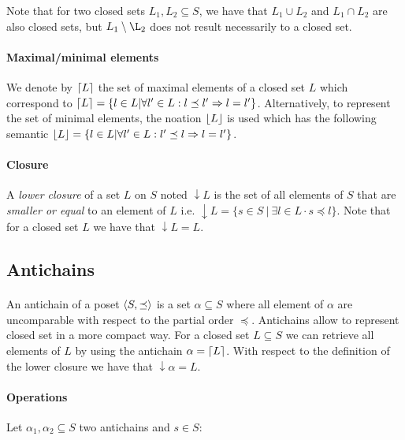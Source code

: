 \documentclass[letterpaper]{memoir}
\DeclarePairedDelimiter{\ceil}{\lceil}{\rceil}
\DeclarePairedDelimiter{\floor}{\lfloor}{\rfloor}
\DeclarePairedDelimiter{\tuple}{\langle}{\rangle}
\begin{document}
Note that for two closed sets $L_1, L_2 \subseteq S$, we have that
$L_1 \cup L_2$ and $L_1 \cap L_2$ are also closed sets,
but $L_1 \setminus \L_2$ does not result necessarily to a closed set.

\paragraph{Maximal/minimal elements} We denote by $\ceil{L}$
the set of maximal elements of a closed set $L$ which
correspond to $\ceil{L} = \{ l \in L | \forall l' \in L :  l \preceq l'
 \Rightarrow l = l' \}$. Alternatively, to represent the set of minimal
 elements, the noation $\floor{L}$ is used which has the following semantic
$\floor{L} = \{ l \in L | \forall l' \in L :  l' \preceq l
 \Rightarrow l = l' \}$.


\paragraph{Closure} A \textit{lower closure} of a set $L$ on $S$
noted $\downarrow L$ is the set of all elements of $S$ that are
\textit{smaller or equal} to an element of $L$ i.e.
$\downarrow L = \{ s \in S \ | \ \exists l \in L \cdot s \preceq l\}$.
Note that for a closed set $L$ we have that $\downarrow L = L$.


\subsection{Antichains}

\paragraph{}

An antichain of a poset $\tuple{S, \preceq}$
is a set $\alpha \subseteq S$ where all element of $\alpha$
are uncomparable with respect to the partial order $\preceq$.
Antichains allow to represent closed set in a more compact way.
For a closed set $L \subseteq S$ we can retrieve all elements of $L$ by using
the antichain $\alpha = \ceil{L}$. With respect
to the definition of the lower closure we have that $\downarrow \alpha = L$.

\paragraph{Operations}

Let $\alpha_1, \alpha_2 \subseteq S$ two antichains and $s \in S$:
\end{document}
